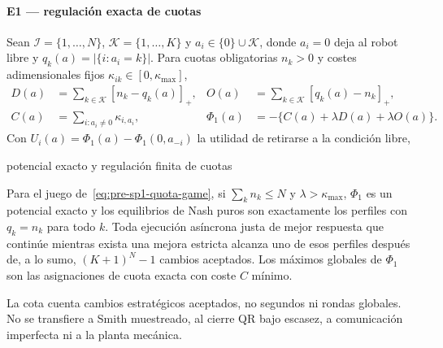 \paragraph{E1 --- regulación exacta de cuotas}
Sean $\mathcal I=\{1,\ldots,N\}$, $\mathcal K=\{1,\ldots,K\}$ y $a_i\in\{0\}\cup\mathcal K$, donde $a_i=0$ deja al robot libre y $q_k(a)=|\{i:a_i=k\}|$. Para cuotas obligatorias $n_k>0$ y costes adimensionales fijos $\kappa_{ik}\in[0,\kappa_{\max}]$,
\begin{equation}
 \begin{aligned}
 D(a)&=\sum_{k\in\mathcal K}[n_k-q_k(a)]_+,&
 O(a)&=\sum_{k\in\mathcal K}[q_k(a)-n_k]_+,\\
 C(a)&=\sum_{i:a_i\ne0}\kappa_{i,a_i},&
 \Phi_1(a)&=-\{C(a)+\lambda D(a)+\lambda O(a)\}.
 \end{aligned}
 \label{eq:pre-sp1-quota-game}
\end{equation}
Con $U_i(a)=\Phi_1(a)-\Phi_1(0,a_{-i})$ la utilidad de retirarse a la
condición libre,

\begin{contribucion}{potencial exacto y regulación finita de cuotas}
\begin{teorema}
\label{thm:pre-sp1-exact-quota}
Para el juego de~\eqref{eq:pre-sp1-quota-game}, si $\sum_kn_k\leq N$ y $\lambda>\kappa_{\max}$, $\Phi_1$ es un potencial exacto y los equilibrios de Nash puros son exactamente los perfiles con $q_k=n_k$ para todo $k$. Toda ejecución asíncrona justa de mejor respuesta que continúe mientras exista una mejora estricta alcanza uno de esos perfiles después de, a lo sumo, $(K+1)^N-1$ cambios aceptados. Los máximos globales de $\Phi_1$ son las asignaciones de cuota exacta con coste $C$ mínimo.
\end{teorema}
La cota cuenta cambios estratégicos aceptados, no segundos ni rondas globales. No se transfiere a Smith muestreado, al cierre QR bajo escasez, a comunicación imperfecta ni a la planta mecánica.
\end{contribucion}

